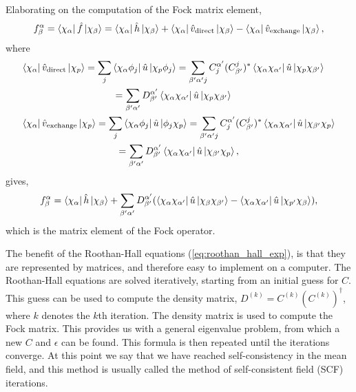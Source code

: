 Elaborating on the computation of the Fock matrix element,
\begin{equation}
    f^\alpha_\beta = \bra{\chi_\alpha} \hat{f} \ket{\chi_\beta}
        = \bra{\chi_\alpha} \hat{h} \ket{\chi_\beta} 
        + \bra{\chi_\alpha} \hat{v}_{\text{direct}} \ket{\chi_\beta}
        - \bra{\chi_\alpha} \hat{v}_{\text{exchange}} \ket{\chi_\beta},
\end{equation}
where
\begin{align}
    &\begin{gathered}
    \bra{\chi_\alpha} \hat{v}_{\text{direct}} \ket{\chi_p}
        = \sum_j \bra{\chi_\alpha \phi_j} \hat{u} \ket{\chi_p \phi_j} 
        = \sum_{\beta'\alpha'j} C^{\alpha'}_j (C^j_{\beta'})^*
            \bra{\chi_\alpha \chi_{\alpha'}} \hat{u} \ket{\chi_p \chi_{\beta'}} \\
        = \sum_{\beta'\alpha'} D^{\alpha'}_{\beta'} \bra{\chi_\alpha \chi_{\alpha'}} \hat{u} \ket{\chi_p \chi_{\beta'}}
    \end{gathered} \\
    &\begin{gathered}
    \bra{\chi_\alpha} \hat{v}_{\text{exchange}} \ket{\chi_p}
        = \sum_j \bra{\chi_\alpha \phi_j} \hat{u} \ket{\phi_j \chi_p} 
        = \sum_{\beta'\alpha'j} C^{\alpha'}_j (C^j_{\beta'})^* 
            \bra{\chi_\alpha \chi_{\alpha'}} \hat{u} \ket{\chi_{\beta'} \chi_p} \\
        = \sum_{\beta'\alpha'} D^{\alpha'}_{\beta'} \bra{\chi_\alpha \chi_{\alpha'}} \hat{u} \ket{\chi_{\beta'} \chi_p},  
    \end{gathered}
\end{align}
gives,
\begin{equation}
    f^\alpha_\beta = \bra{\chi_\alpha}\hat{h} \ket{\chi_\beta} 
        + \sum_{\beta'\alpha'}D^{\alpha'}_{\beta'}(
            \bra{\chi_\alpha\chi_{\alpha'}}\hat{u} \ket{\chi_\beta\chi_{\beta'}}
            - \bra{\chi_\alpha\chi_{\alpha'}}\hat{u} \ket{\chi_{p'}\chi_\beta}
        ),
\end{equation}
which is the matrix element of the Fock operator.

The benefit of the Roothan-Hall equations (\autoref{eq:roothan_hall_exp}), is that they 
are represented by matrices, and therefore easy to implement on a computer. The
Roothan-Hall equations are solved iteratively, starting from an initial guess for $C$. 
This guess can be used to compute the density matrix, 
$D^{(k)} = C^{(k)}(C^{(k)})^\dagger$, where $k$ denotes the $k$th iteration. The density 
matrix is used to compute the Fock matrix. This provides us with a general eigenvalue 
problem, from which a new $C$ and $\epsilon$ can be found. This formula is then repeated
until the iterations converge. At this point we say that we have reached self-consistency 
in the mean field, and this method is usually called the method of self-consistent
field (SCF) iterations.

